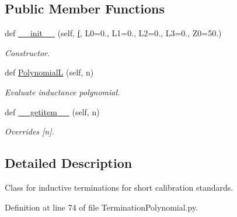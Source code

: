 \subsection*{Public Member Functions}
\begin{DoxyCompactItemize}
\item 
def \hyperlink{classSignalIntegrity_1_1Measurement_1_1CalKit_1_1Standards_1_1TerminationPolynomial_1_1TerminationLPolynomial_a303b1dbfa2c0490e6e89fbeb96b3b388}{\+\_\+\+\_\+init\+\_\+\+\_\+} (self, \hyperlink{classSignalIntegrity_1_1SParameters_1_1SParameters_1_1SParameters_a32e7a34d6837fe949b413c852a0447f8}{f}, L0=0., L1=0., L2=0., L3=0., Z0=50.)
\begin{DoxyCompactList}\small\item\em Constructor. \end{DoxyCompactList}\item 
def \hyperlink{classSignalIntegrity_1_1Measurement_1_1CalKit_1_1Standards_1_1TerminationPolynomial_1_1TerminationLPolynomial_a23845d1c2e68be54864a11c6127f5004}{PolynomialL} (self, n)
\begin{DoxyCompactList}\small\item\em Evaluate inductance polynomial. \end{DoxyCompactList}\item 
def \hyperlink{classSignalIntegrity_1_1Measurement_1_1CalKit_1_1Standards_1_1TerminationPolynomial_1_1TerminationLPolynomial_ab7a6da5139e0878b590d68292aaa70f2}{\+\_\+\+\_\+getitem\+\_\+\+\_\+} (self, n)
\begin{DoxyCompactList}\small\item\em Overrides \mbox{[}n\mbox{]}. \end{DoxyCompactList}\end{DoxyCompactItemize}


\subsection{Detailed Description}
Class for inductive terminations for short calibration standards. 

Definition at line 74 of file Termination\+Polynomial.\+py.



